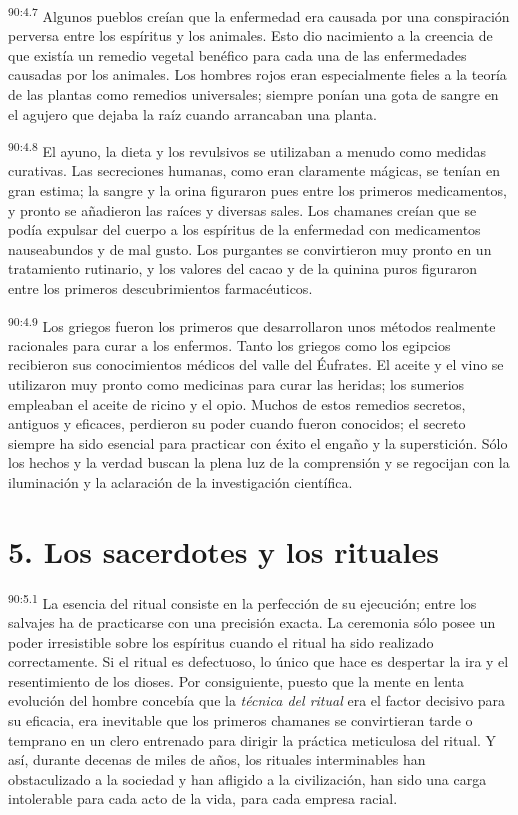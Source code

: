 \par
\textsuperscript{90:4.7} Algunos pueblos creían que la enfermedad era causada por una conspiración perversa entre los espíritus y los animales. Esto dio nacimiento a la creencia de que existía un remedio vegetal benéfico para cada una de las enfermedades causadas por los animales. Los hombres rojos eran especialmente fieles a la teoría de las plantas como remedios universales; siempre ponían una gota de sangre en el agujero que dejaba la raíz cuando arrancaban una planta.

\par
\textsuperscript{90:4.8} El ayuno, la dieta y los revulsivos se utilizaban a menudo como medidas curativas. Las secreciones humanas, como eran claramente mágicas, se tenían en gran estima; la sangre y la orina figuraron pues entre los primeros medicamentos, y pronto se añadieron las raíces y diversas sales. Los chamanes creían que se podía expulsar del cuerpo a los espíritus de la enfermedad con medicamentos nauseabundos y de mal gusto. Los purgantes se convirtieron muy pronto en un tratamiento rutinario, y los valores del cacao y de la quinina puros figuraron entre los primeros descubrimientos farmacéuticos.

\par
\textsuperscript{90:4.9} Los griegos fueron los primeros que desarrollaron unos métodos realmente racionales para curar a los enfermos. Tanto los griegos como los egipcios recibieron sus conocimientos médicos del valle del Éufrates. El aceite y el vino se utilizaron muy pronto como medicinas para curar las heridas; los sumerios empleaban el aceite de ricino y el opio. Muchos de estos remedios secretos, antiguos y eficaces, perdieron su poder cuando fueron conocidos; el secreto siempre ha sido esencial para practicar con éxito el engaño y la superstición. Sólo los hechos y la verdad buscan la plena luz de la comprensión y se regocijan con la iluminación y la aclaración de la investigación científica.

\section*{5. Los sacerdotes y los rituales}
\par
\textsuperscript{90:5.1} La esencia del ritual consiste en la perfección de su ejecución; entre los salvajes ha de practicarse con una precisión exacta. La ceremonia sólo posee un poder irresistible sobre los espíritus cuando el ritual ha sido realizado correctamente. Si el ritual es defectuoso, lo único que hace es despertar la ira y el resentimiento de los dioses. Por consiguiente, puesto que la mente en lenta evolución del hombre concebía que la \textit{técnica del ritual} era el factor decisivo para su eficacia, era inevitable que los primeros chamanes se convirtieran tarde o temprano en un clero entrenado para dirigir la práctica meticulosa del ritual. Y así, durante decenas de miles de años, los rituales interminables han obstaculizado a la sociedad y han afligido a la civilización, han sido una carga intolerable para cada acto de la vida, para cada empresa racial.

